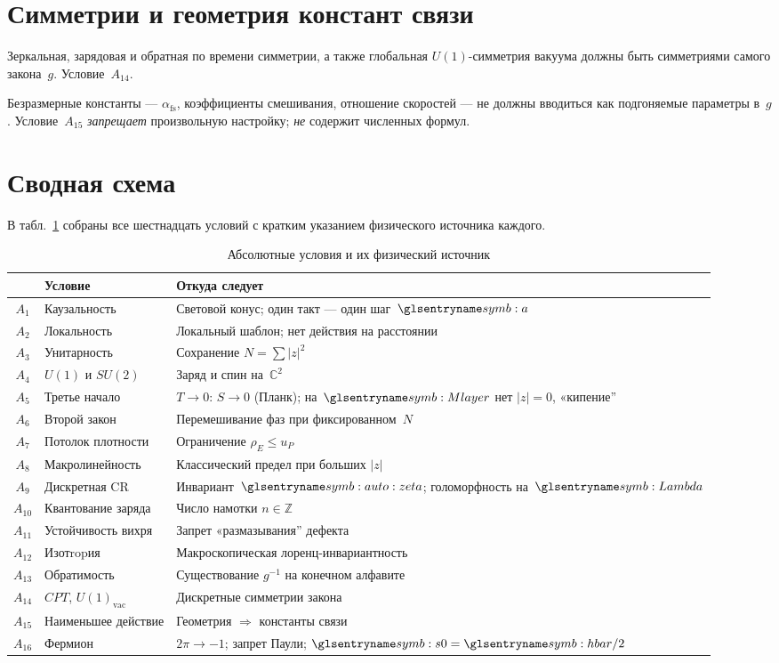 \section{Симметрии и геометрия констант связи}

Зеркальная, зарядовая и обратная по времени симметрии, а также глобальная $U(1)$-симметрия
вакуума должны быть симметриями самого закона~$g$.
Условие~$A_{14}$.

Безразмерные константы --- $\alpha_{\mathrm{fs}}$, коэффициенты смешивания, отношение скоростей ---
не должны вводиться как подгоняемые параметры в~$g$.
Условие~$A_{15}$ \emph{запрещает} произвольную настройку; \emph{не} содержит численных формул.

\section{Сводная схема}

В табл.~\ref{tab:full-map} собраны все шестнадцать условий с кратким указанием
физического источника каждого.

\begin{table}[ht]
\centering
\caption{Абсолютные условия и их физический источник}
\label{tab:full-map}
\small
\begin{tabular}{@{}clp{7.4cm}@{}}
\toprule
 & Условие & Откуда следует \\
\midrule
$A_1$ & Каузальность & Световой конус; один такт --- один шаг~$\caStepSpace$ \\
$A_2$ & Локальность & Локальный шаблон; нет действия на расстоянии \\
$A_3$ & Унитарность & Сохранение $N=\sum|z|^2$ \\
$A_4$ & $U(1)$ и $SU(2)$ & Заряд и спин на~$\mathbb{C}^2$ \\
$A_5$ & Третье начало & $T\to 0$: $S\to 0$ (Планк); на~$\layerMicro$ нет $|z|=0$, «кипение'' \\
$A_6$ & Второй закон & Перемешивание фаз при фиксированном~$N$ \\
$A_7$ & Потолок плотности & Ограничение $\rho_E\le u_P$ \\
$A_8$ & Макролинейность & Классический предел при больших $|z|$ \\
$A_9$ & Дискретная CR & Инвариант~$\symZeta$; голоморфность на~$\carrierLattice$ \\
$A_{10}$ & Квантование заряда & Число намотки $n\in\mathbb{Z}$ \\
$A_{11}$ & Устойчивость вихря & Запрет «размазывания'' дефекта \\
$A_{12}$ & Изотropия & Макроскопическая лоренц-инвариантность \\
$A_{13}$ & Обратимость & Существование $g^{-1}$ на конечном алфавите \\
$A_{14}$ & $CPT$, $U(1)_{\mathrm{vac}}$ & Дискретные симметрии закона \\
$A_{15}$ & Наименьшее действие & Геометрия $\Rightarrow$ константы связи \\
$A_{16}$ & Фермион & $2\pi\to -1$; запрет Паули; $\ladderAction=\planckHbar/2$ \\
\bottomrule
\end{tabular}
\end{table}

